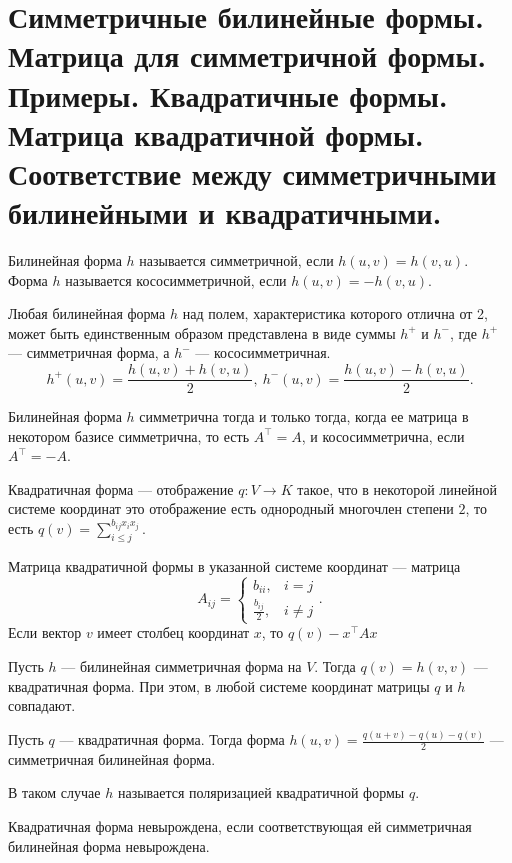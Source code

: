 \section{Симметричные билинейные формы. Матрица для симметричной формы. Примеры. Квадратичные формы. Матрица квадратичной формы. Соответствие между симметричными билинейными и квадратичными.}
\begin{defn}
    Билинейная форма $ h$ называется {\sf симметричной}, если $ h(u, v) = h(v, u)$. Форма  $ h$ называется {\sf кососимметричной}, если  $ h(u, v) = -h(v, u)$.
\end{defn}
\begin{note}
    Любая билинейная форма $ h$ над полем, характеристика которого отлична от 2, может быть единственным образом представлена в виде суммы $ h^{+}$ и $ h^{-}$, где $ h^{+}$ --- симметричная форма, а  $ h^{-}$ --- кососимметричная.
    \[
	h^{+}(u, v) = \frac{h(u, v) + h(v, u)}{2} , ~ h^{-} (u, v)= \frac{h(u, v) - h(v, u)}{2}
    .\] 
\end{note}

\begin{lm}
    Билинейная форма $ h$ симметрична  тогда и только тогда, когда ее матрица в некотором базисе симметрична, то есть $ A^{\top} = A$, и кососимметрична, если $ A^{\top} = -A$.
\end{lm}

\begin{defn}
    {\sf Квадратичная форма}  --- отображение  $ q \colon V \to K$ такое, что в некоторой линейной системе координат это отображение есть однородный многочлен степени $ 2$, то есть $ q(v) = \sum_{i \le j}^{b_{ij}x_ix_j} $.

    {\sf Матрица квадратичной формы} в указанной системе координат --- матрица 
    \[
    A_{ij} = 
    \begin{cases}
	b_{ii}, & i = j \\
	\frac{b_{ij}}{2}, & i \ne j
    \end{cases}
    .\] 
    Если вектор $ v$ имеет столбец координат  $x$, то  $ q(v) - x^{\top}Ax$
\end{defn}
\begin{st}
    Пусть $ h$ --- билинейная симметричная форма на $ V$. Тогда $ q(v) = h(v, v)$ --- квадратичная форма. При этом, в любой системе координат  матрицы $  q$ и  $ h$ совпадают.
\end{st}
\begin{note}
Пусть $ q$ --- квадратичная форма. Тогда форма $ h(u, v) = \frac{q(u+v) - q(u) - q(v)}{2}$ --- симметричная билинейная форма.

В таком случае $ h$ называется  {\sf поляризацией} квадратичной формы $ q$.  
\end{note}
\begin{defn}[Невырожденность]
    Квадратичная форма {\sf невырождена}, если соответствующая ей симметричная билинейная форма невырождена.   
\end{defn}
